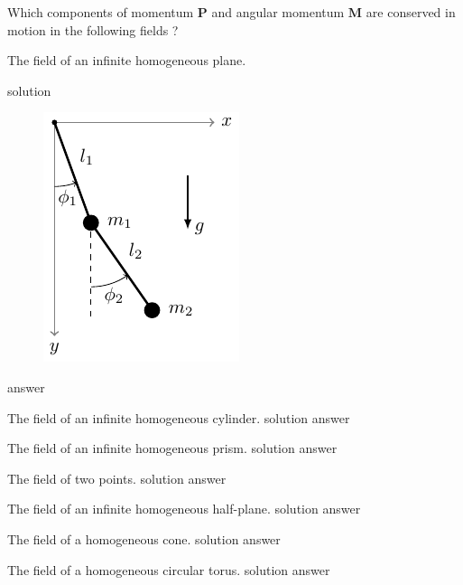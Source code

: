 
\begin{problem}
{
Which components of momentum $\mathbf{P}$ and angular momentum $\mathbf{M}$ are conserved in motion in the following fields ?
}{}{}
\end{problem}
\begin{subproblem}
{
The field of an infinite homogeneous plane.
}
{
solution
\begin{figure}[H]
    \centering
    \includegraphics[page=5]{Figures/tikzpics.pdf}
\end{figure}
}
{
answer
}
\end{subproblem}

\begin{subproblem}
{
The field of an infinite homogeneous cylinder.
}
{
solution
}
{
answer
}
\end{subproblem}

\begin{subproblem}
{
The field of an infinite homogeneous prism.
}
{
solution
}
{
answer
}
\end{subproblem}

\begin{subproblem}
{
The field of two points.
}
{
solution
}
{
answer
}
\end{subproblem}

\begin{subproblem}
{
The field of an infinite homogeneous half-plane.
}
{
solution
}
{
answer
}
\end{subproblem}

\begin{subproblem}
{
The field of a homogeneous cone.
}
{
solution
}
{
answer
}
\end{subproblem}

\begin{subproblem}
{
The field of a homogeneous circular torus.
}
{
solution
}
{
answer
}
\end{subproblem}

